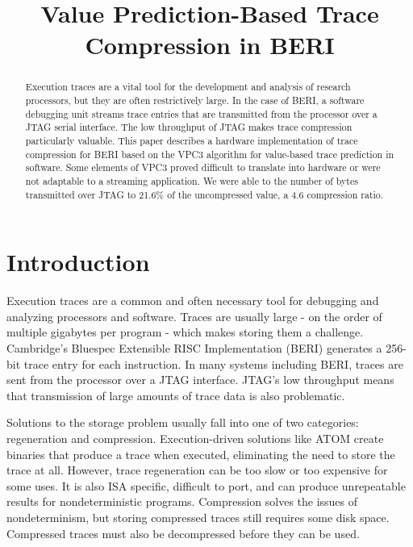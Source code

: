 \documentclass[conference]{IEEEtran}
\begin{document}
%
\title{Value Prediction-Based Trace Compression in BERI} %


\author{
}


\maketitle

\begin{abstract}
Execution traces are a vital tool for the development and analysis of research processors, but they are often
restrictively large. In the case of BERI, a software debugging unit streams trace entries that are transmitted from the processor over
a JTAG serial interface. The low throughput of JTAG makes trace compression particularly valuable. 
This paper describes a hardware implementation of trace compression for BERI based on the VPC3 algorithm for 
value-based trace prediction in software. Some elements of VPC3 proved difficult to translate into hardware or were not adaptable to a streaming application. We were able to the number of bytes transmitted over JTAG to 21.6\% of the uncompressed value, a 4.6 compression ratio. %
\end{abstract}

\section{Introduction}
Execution traces are a common and often necessary tool for debugging and analyzing processors and software. Traces are usually large - on the order of multiple gigabytes per program - which makes storing them a challenge. Cambridge's Bluespec Extensible RISC Implementation (BERI) \cite{beri} generates a 256-bit trace entry for each instruction. 
In many systems including BERI, traces are sent from the processor over a JTAG interface. JTAG's low throughput means that transmission of large amounts of trace data is also problematic. 

Solutions to the storage problem usually fall into one of two categories: regeneration and compression. Execution-driven solutions like ATOM \cite{ATOM} create binaries that produce a trace when executed, eliminating the need to store the trace at all. However, trace regeneration can be too slow or too expensive for some uses. It is also ISA specific, difficult to port, and can produce unrepeatable results for nondeterministic programs. Compression solves the issues of nondeterminism, but storing compressed traces still requires some disk space. Compressed traces must also be decompressed before they can be used.
\end{document}
